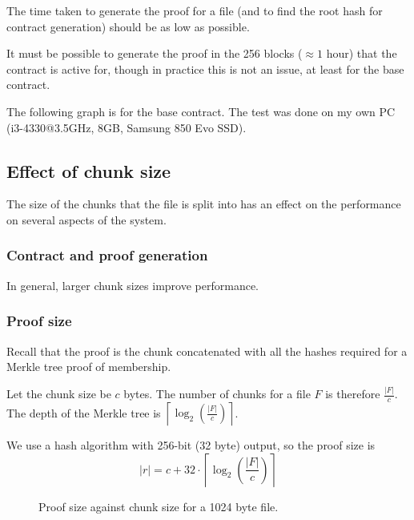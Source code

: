 \documentclass[10pt,twoside,a4paper]{article}
\begin{document}
The time taken to generate the proof for a file (and to find the root hash for contract generation) should be as low as possible.

It must be possible to generate the proof in the 256 blocks ($\approx 1$ hour)  that the contract is active for,
though in practice this is not an issue, at least for the base contract.

The following graph is for the base contract.
The test was done on my own PC (i3-4330@3.5GHz, 8GB, Samsung 850 Evo SSD).

\subsection{Effect of chunk size} %

The size of the chunks that the file is split into has an effect on the performance on several aspects of the system.

\subsubsection{Contract and proof generation}

In general, larger chunk sizes improve performance.

\subsubsection{Proof size} \label{chunk-size-proof-size}

Recall that the proof is the chunk concatenated with all the hashes required for a Merkle tree proof of membership.

Let the chunk size be $c$ bytes.
The number of chunks for a file $F$ is therefore $\frac{|F|}{c}$.
The depth of the Merkle tree is $\left\lceil\log_2\left(\frac{|F|}{c}\right)\right\rceil$.

We use a hash algorithm with 256-bit (32 byte) output, so the proof size is
\[|r| = c + 32 \cdot \left\lceil\log_2\left(\frac{|F|}{c}\right)\right\rceil\]

\begin{figure}[h]
\label{eval-graph-chunk-size}
\caption[Chunk size graph]{Proof size against chunk size for a 1024 byte file.}
\end{figure}
\end{document}
